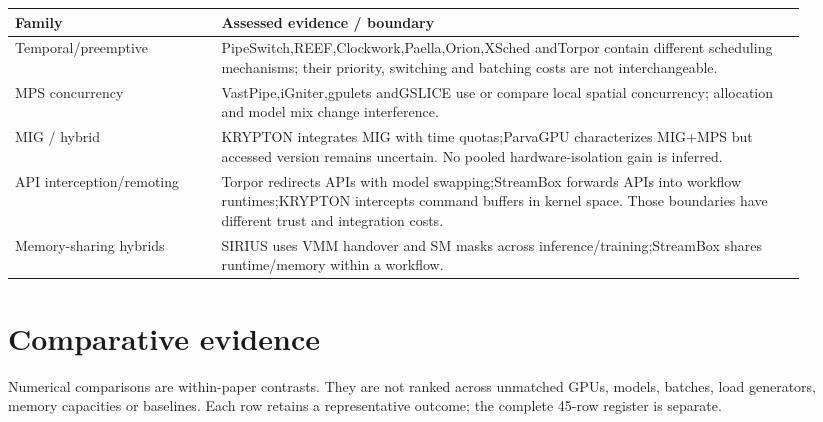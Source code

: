 \documentclass[12pt,a4paper]{article}
\begin{document}
{\small\begin{longtable}{>{\raggedright\arraybackslash}p{0.24\linewidth}>{\raggedright\arraybackslash}p{0.68\linewidth}}
\toprule
Family & Assessed evidence /\allowbreak{} boundary\\\midrule
\endhead
Temporal/\allowbreak{}preemptive & PipeSwitch,REEF,Clockwork,Paella,Orion,XSched andTorpor contain different scheduling mechanisms; their priority, switching and batching costs are not interchangeable.\\
MPS concurrency & VastPipe,iGniter,gpulets andGSLICE use or compare local spatial concurrency; allocation and model mix change interference.\\
MIG /\allowbreak{} hybrid & KRYPTON integrates MIG with time quotas;ParvaGPU characterizes MIG+MPS but accessed version remains uncertain. No pooled hardware-isolation gain is inferred.\\
API interception/\allowbreak{}remoting & Torpor redirects APIs with model swapping;StreamBox forwards APIs into workflow runtimes;KRYPTON intercepts command buffers in kernel space. Those boundaries have different trust and integration costs.\\
Memory-sharing hybrids & SIRIUS uses VMM handover and SM masks across inference/\allowbreak{}training;StreamBox shares runtime/\allowbreak{}memory within a workflow.\\
\bottomrule
\end{longtable}}


\section{Comparative evidence}

Numerical comparisons are within-paper contrasts. They are not ranked across unmatched GPUs, models, batches, load generators, memory capacities or baselines. Each row retains a representative outcome; the complete 45-row register is separate.
\end{document}
